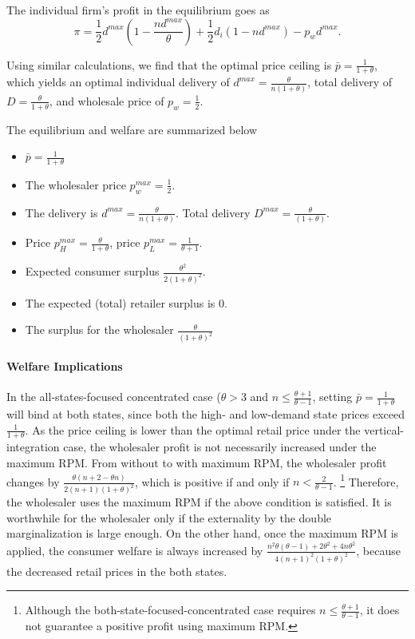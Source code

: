 \documentclass[12pt]{article}
\begin{document}
The individual firm's profit in the equilibrium goes as
\begin{equation}
	\pi = \frac{1}{2}d^{max}(1 - \frac{nd^{max}}{\theta}) +  \frac{1}{2}d_i(1 - nd^{max}) -  p_wd^{max}.
\end{equation}

Using similar calculations, we find that the optimal price ceiling is $\bar{p} = \frac{1}{1 + \theta}$, which yields an optimal individual delivery of $d^{max} = \frac{\theta}{n(1+\theta)}$, total delivery of $D = \frac{\theta}{1 + \theta}$, and wholesale price of $ p_w = \frac{1}{2}$.


The equilibrium and welfare are summarized below
\begin{itemize}
	\item $\bar{p} = \frac{1}{1 + \theta}$
	\item The wholesaler price  $p^{max}_w =\frac{1}{2}$. 
	\item The delivery is $d^{max} = \frac{\theta}{n(1+\theta)}$. Total delivery $D^{max} = \frac{\theta}{(1+\theta)}$. 
	\item Price $p^{max}_{H} = \frac{\theta}{1+\theta}$, price $p^{max}_L = \frac{1}{\theta+ 1}$.
	\item Expected consumer surplus $\frac{\theta^2}{2(1+\theta)^2}$. 
	\item The expected (total) retailer surplus is 0. 
	\item The surplus for the wholesaler $\frac{\theta}{(1+\theta)^2}$
\end{itemize}    

\paragraph{Welfare Implications} 

In the all-states-focused concentrated case ($\theta > 3$ and $n \leq \frac{\theta + 1}{\theta - 1}$, setting $\bar{p} = \frac{1}{1 + \theta}$ will bind at both states, since both the high- and low-demand state prices exceed $\frac{1}{1+\theta}$.
As the price ceiling is lower than the optimal retail price under the vertical-integration case, the wholesaler profit is not necessarily increased under the maximum RPM. From without to with maximum RPM, the wholesaler profit changes by $\frac{\theta (n + 2 - \theta n)}{2(n+1)(1 + \theta)^2}$, which is positive if and only if $n < \frac{2}{\theta - 1}$. \footnote{Although the both-state-focused-concentrated case requires $n \leq \frac{\theta + 1}{\theta - 1}$, it does not guarantee a positive profit using maximum RPM.} Therefore, the wholesaler uses the maximum RPM if the above condition is satisfied. It is worthwhile for the wholesaler only if the externality by the double marginalization is large enough.  On the other hand, once the maximum RPM is applied, the consumer welfare is always increased by $\frac{n^2\theta(\theta - 1) + 2\theta^2 + 4n\theta^2}{4(n+1)^2(1+\theta)^2}$, because the decreased retail prices in the both states. 
\end{document}
